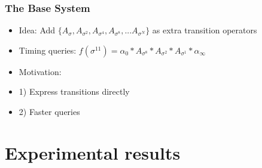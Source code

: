 \documentclass{beamer}
\begin{document}
\begin{frame}
\frametitle{The Base System}
\begin{itemize}

\item Idea: Add $\{A_{\sigma}, A_{\sigma^2}, A_{\sigma^4}, A_{\sigma^8}, ... A_{\sigma^N}\}$ as extra transition operators

\item Timing queries: $f(\sigma^{11}) = \alpha_0*A_{\sigma^8}*A_{\sigma^2}*A_{\sigma^1}*\alpha_\infty$

\item Motivation: 
\item[] 1) Express transitions directly
\item[] 2) Faster queries
\end{itemize}
\end{frame}

\section{Experimental results}
\end{document}
